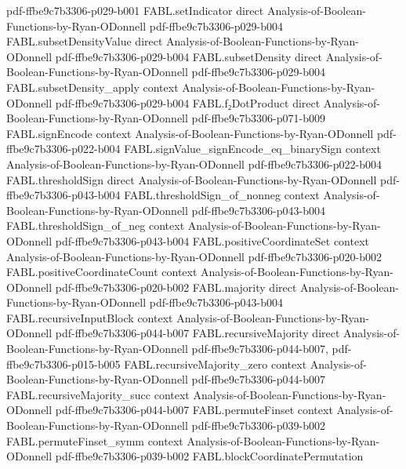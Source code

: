 \begin{theorem}
  {pdf-ffbe9c7b3306-p029-b001}
\proofstep
  {FABL.setIndicator}
  {direct}
  {Analysis-of-Boolean-Functions-by-Ryan-ODonnell}
  {pdf-ffbe9c7b3306-p029-b004}
\proofstep
  {FABL.subsetDensityValue}
  {direct}
  {Analysis-of-Boolean-Functions-by-Ryan-ODonnell}
  {pdf-ffbe9c7b3306-p029-b004}
\proofstep
  {FABL.subsetDensity}
  {direct}
  {Analysis-of-Boolean-Functions-by-Ryan-ODonnell}
  {pdf-ffbe9c7b3306-p029-b004}
\proofstep
  {FABL.subsetDensity_apply}
  {context}
  {Analysis-of-Boolean-Functions-by-Ryan-ODonnell}
  {pdf-ffbe9c7b3306-p029-b004}
\proofstep
  {FABL.f₂DotProduct}
  {direct}
  {Analysis-of-Boolean-Functions-by-Ryan-ODonnell}
  {pdf-ffbe9c7b3306-p071-b009}
\proofstep
  {FABL.signEncode}
  {context}
  {Analysis-of-Boolean-Functions-by-Ryan-ODonnell}
  {pdf-ffbe9c7b3306-p022-b004}
\proofstep
  {FABL.signValue_signEncode_eq_binarySign}
  {context}
  {Analysis-of-Boolean-Functions-by-Ryan-ODonnell}
  {pdf-ffbe9c7b3306-p022-b004}
\proofstep
  {FABL.thresholdSign}
  {direct}
  {Analysis-of-Boolean-Functions-by-Ryan-ODonnell}
  {pdf-ffbe9c7b3306-p043-b004}
\proofstep
  {FABL.thresholdSign_of_nonneg}
  {context}
  {Analysis-of-Boolean-Functions-by-Ryan-ODonnell}
  {pdf-ffbe9c7b3306-p043-b004}
\proofstep
  {FABL.thresholdSign_of_neg}
  {context}
  {Analysis-of-Boolean-Functions-by-Ryan-ODonnell}
  {pdf-ffbe9c7b3306-p043-b004}
\proofstep
  {FABL.positiveCoordinateSet}
  {context}
  {Analysis-of-Boolean-Functions-by-Ryan-ODonnell}
  {pdf-ffbe9c7b3306-p020-b002}
\proofstep
  {FABL.positiveCoordinateCount}
  {context}
  {Analysis-of-Boolean-Functions-by-Ryan-ODonnell}
  {pdf-ffbe9c7b3306-p020-b002}
\proofstep
  {FABL.majority}
  {direct}
  {Analysis-of-Boolean-Functions-by-Ryan-ODonnell}
  {pdf-ffbe9c7b3306-p043-b004}
\proofstep
  {FABL.recursiveInputBlock}
  {context}
  {Analysis-of-Boolean-Functions-by-Ryan-ODonnell}
  {pdf-ffbe9c7b3306-p044-b007}
\proofstep
  {FABL.recursiveMajority}
  {direct}
  {Analysis-of-Boolean-Functions-by-Ryan-ODonnell}
  {pdf-ffbe9c7b3306-p044-b007,
    pdf-ffbe9c7b3306-p015-b005}
\proofstep
  {FABL.recursiveMajority_zero}
  {context}
  {Analysis-of-Boolean-Functions-by-Ryan-ODonnell}
  {pdf-ffbe9c7b3306-p044-b007}
\proofstep
  {FABL.recursiveMajority_succ}
  {context}
  {Analysis-of-Boolean-Functions-by-Ryan-ODonnell}
  {pdf-ffbe9c7b3306-p044-b007}
\proofstep
  {FABL.permuteFinset}
  {context}
  {Analysis-of-Boolean-Functions-by-Ryan-ODonnell}
  {pdf-ffbe9c7b3306-p039-b002}
\proofstep
  {FABL.permuteFinset_symm}
  {context}
  {Analysis-of-Boolean-Functions-by-Ryan-ODonnell}
  {pdf-ffbe9c7b3306-p039-b002}
\proofstep
  {FABL.blockCoordinatePermutation}

\end{theorem}
